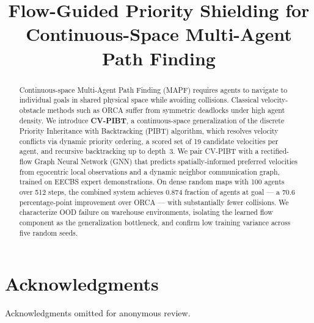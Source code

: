 \documentclass[conference]{IEEEtran}
\begin{document}
\title{Flow-Guided Priority Shielding for\\Continuous-Space Multi-Agent Path Finding}

\author{%
}

\maketitle

\begin{abstract}
Continuous-space Multi-Agent Path Finding (MAPF) requires agents to navigate to individual goals in shared physical space while avoiding collisions. Classical velocity-obstacle methods such as ORCA suffer from symmetric deadlocks under high agent density. We introduce \textbf{CV-PIBT}, a continuous-space generalization of the discrete Priority Inheritance with Backtracking (PIBT) algorithm, which resolves velocity conflicts via dynamic priority ordering, a scored set of 19 candidate velocities per agent, and recursive backtracking up to depth~3. We pair CV-PIBT with a rectified-flow Graph Neural Network (GNN) that predicts spatially-informed preferred velocities from egocentric local observations and a dynamic neighbor communication graph, trained on EECBS expert demonstrations. On dense random maps with 100 agents over 512 steps, the combined system achieves $0.874$ fraction of agents at goal --- a 70.6 percentage-point improvement over ORCA --- with substantially fewer collisions. We characterize OOD failure on warehouse environments, isolating the learned flow component as the generalization bottleneck, and confirm low training variance across five random seeds.
\end{abstract}







\section*{Acknowledgments}
\small{Acknowledgments omitted for anonymous review.}



\end{document}
